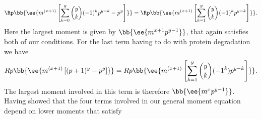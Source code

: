 \begin{equation}
  \Rp \bb{\ee{m^{(x + 1)} \left[ \sum_{k=0}^y {y \choose k} (-1)^k p^{y-k}
                                - p^y \right]}} =
  \Rp \bb{\ee{m^{(x + 1)} \left[ \sum_{k=1}^y {y \choose k}(-1)^k p^{y-k}
  \right]}}.
\end{equation}
Here the largest moment is given by $\bb{\ee{m^{x+1} p^{y-1}}}$, that again
satisfies both of our conditions. For the last term having to do with protein
degradation we have
\begin{equation}
  Rp \bb{\ee{m^{(x + 1)} \left[ (p + 1)^y - p^y \right]}} =
  Rp \bb{\ee{m^{(x + 1)} \left[ \sum_{k=1}^y {y \choose k} (-1^k) p^{y - k}
  \right]}}.
\end{equation}
The largest moment involved in this term is therefore $\bb{\ee{m^x p^{y-1}}}$.
Having showed that the four terms involved in our general moment equation depend
on lower moments that satisfy 
